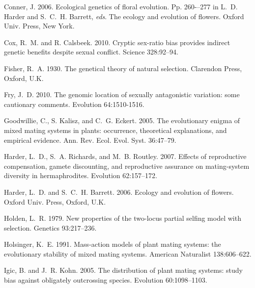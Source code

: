 \documentclass{article}
\begin{document}
\begin{thebibliography}{}
Conner, J. 2006.
\newblock Ecological genetics of floral evolution.
\newblock Pp. 260-–277 in L.~D. Harder and S.~C.~H. Barrett, \textit{eds}. The ecology and evolution of flowers. Oxford Univ. Press, New York.

Cox, R.~M. and R. Calsbeek. 2010.
\newblock Cryptic sex-ratio bias provides indirect genetic benefits despite sexual conflict.
\newblock Science 328:92--94.

Fisher, R.~A. 1930.
\newblock The genetical theory of natural selection.
\newblock Clarendon Press, Oxford, U.K.

Fry, J.~D. 2010.
\newblock The genomic location of sexually antagonistic variation: some cautionary comments.
\newblock Evolution 64:1510-1516.

Goodwillie, C., S. Kalisz, and C.~G. Eckert. 2005.
\newblock The evolutionary enigma of mixed mating systems in plants: occurrence, theoretical explanations, and empirical evidence.
\newblock Ann. Rev. Ecol. Evol. Syst. 36:47--79.

Harder, L.~D., S.~A. Richards, and M.~B. Routley. 2007.
\newblock Effects of reproductive compensation, gamete discounting, and reproductive assurance on mating-system diversity in hermaphrodites.
\newblock Evolution 62:157--172.

Harder, L.~D. and S.~C.~H. Barrett. 2006.
\newblock Ecology and evolution of flowers.
\newblock Oxford Univ. Press, Oxford, U.K.

Holden, L.~R. 1979.
\newblock New properties of the two-locus partial selfing model with selection.
\newblock Genetics 93:217--236.

Holsinger, K.~E. 1991.
\newblock Mass-action models of plant mating systems: the evolutionary stability of mixed mating systems.
\newblock American Naturalist 138:606--622.

Igic, B. and J.~R. Kohn. 2005.
\newblock The distribution of plant mating systems: study bias against obligately outcrossing species.
\newblock Evolution 60:1098--1103.


\end{thebibliography}
\end{document}
